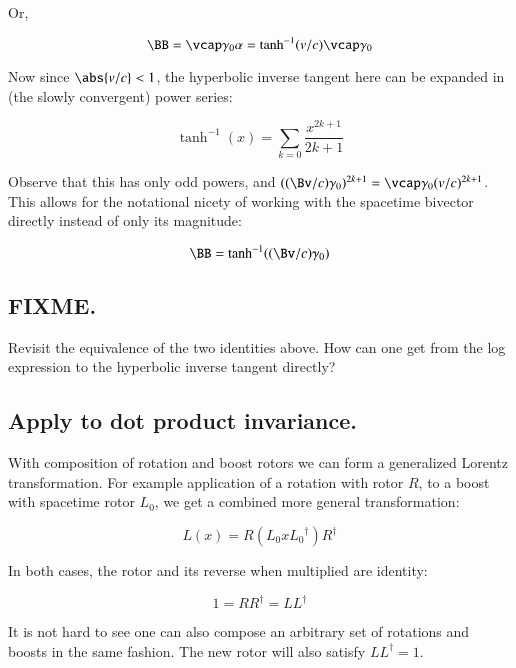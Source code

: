 Or,

\begin{equation*}
\BB = \vcap \gamma_0 \alpha = \tanh^{-1}(v/c) \vcap \gamma_0
\end{equation*}

Now since $\abs{v/c} < 1$, the hyperbolic inverse tangent here can be expanded in (the slowly convergent) power series:

\begin{equation*}
\tanh^{-1}(x) = \sum_{k=0} \frac{x^{2k+1}}{2k+1}
\end{equation*}

Observe that this has only odd powers, and $((\Bv/c) \gamma_0)^{2k+1} = \vcap\gamma_0 (v/c)^{2k+1}$.  This allows for the notational nicety of working with the spacetime bivector directly instead of only its magnitude:

\begin{equation}
\BB = \tanh^{-1}((\Bv/c) \gamma_0)
\end{equation}

\subsection{FIXME. }

Revisit the equivalence of the two identities above.  How can one get from the log
expression to the hyperbolic inverse tangent directly?

\subsection{Apply to dot product invariance. }

With composition of rotation and boost rotors we can form a generalized Lorentz transformation.  For example application of a rotation with rotor $R$, to a boost with spacetime rotor $L_0$, we get a combined more general transformation:

\begin{equation*}
L(x) = R ( L_0 x {L_0}^\dagger ) R^\dagger
\end{equation*}

In both cases, the rotor and its reverse when multiplied are identity:

\begin{equation*}
1 = R R^\dagger = L L^\dagger
\end{equation*}

It is not hard to see one can also compose an arbitrary set of rotations and boosts in the same fashion.  The new rotor will also satisfy $L L^\dagger = 1$.

